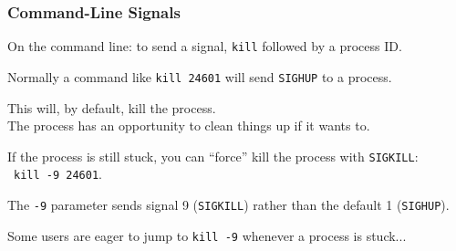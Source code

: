 \begin{frame}
	\frametitle{Command-Line Signals}

	On the command line: to send a signal, \texttt{kill} followed by a process ID.

	Normally a command like \texttt{kill 24601} will send \texttt{SIGHUP} to a process.

	This will, by default, kill the process.\\
	\quad The process has an opportunity to clean things up if it wants to.

	If the process is still stuck, you can ``force'' kill the process with \texttt{SIGKILL}:\\\ \quad \texttt{kill -9 24601}.

	The \texttt{-9} parameter sends signal 9 (\texttt{SIGKILL}) rather than the default 1 (\texttt{SIGHUP}).

	Some users are eager to jump to \texttt{kill -9} whenever a process is stuck...
\end{frame}









